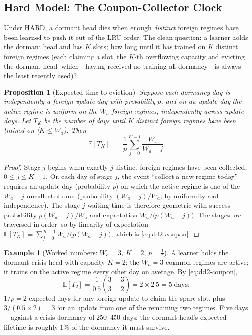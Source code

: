 \documentclass[11pt,a4paper]{article}
\theoremstyle{definition}
\newtheorem{example}{Example}[section]
\theoremstyle{plain}
\newtheorem{proposition}{Proposition}[section]
\newcommand{\E}{\mathbb{E}}
\begin{document}
\subsection{Hard Model: The Coupon-Collector Clock}

Under HARD, a dormant head dies when enough \emph{distinct} foreign regimes
have been learned to push it out of the LRU order. The clean question: a
learner holds the dormant head and has $K$ slots; how long until it has
trained on $K$ distinct foreign regimes (each claiming a slot, the $K$-th
overflowing capacity and evicting the dormant head, which---having received no
training all dormancy---is always the least recently used)?

\begin{proposition}[Expected time to eviction]
\label{prop:dd2-coupon}
Suppose each dormancy day is independently a foreign-update day with
probability $p$, and on an update day the active regime is uniform on the
$W_a$ foreign regimes, independently across update days. Let $T_K$ be the
number of days until $K$ distinct foreign regimes have been trained on
($K \le W_a$). Then
\begin{equation}
\label{eq:dd2-coupon}
\E[T_K] \;=\; \frac{1}{p} \sum_{j=0}^{K-1} \frac{W_a}{W_a - j}.
\end{equation}
\end{proposition}

\begin{proof}
Stage $j$ begins when exactly $j$ distinct foreign regimes have been
collected, $0 \le j \le K-1$. On each day of stage $j$, the event ``collect a
new regime today'' requires an update day (probability $p$) on which the
active regime is one of the $W_a - j$ uncollected ones (probability
$(W_a - j)/W_a$, by uniformity and independence). The stage-$j$ waiting time
is therefore geometric with success probability $p (W_a - j)/W_a$ and
expectation $W_a / \bigl(p (W_a - j)\bigr)$. The stages are traversed in
order, so by linearity of expectation
$\E[T_K] = \sum_{j=0}^{K-1} W_a / \bigl(p(W_a - j)\bigr)$, which is
\eqref{eq:dd2-coupon}.
\end{proof}

\begin{example}[Worked numbers: $W_a = 3$, $K = 2$, $p = \tfrac12$]
\label{ex:dd2-coupon}
A learner holds the dormant \textsf{crisis} head with capacity $K = 2$; the
$W_a = 3$ common regimes are active; it trains on the active regime every
other day on average. By \eqref{eq:dd2-coupon},
\[
\E[T_2]
= \frac{1}{0.5}\left(\frac{3}{3} + \frac{3}{2}\right)
= 2 \times 2.5
= 5 \text{ days}:
\]
$1/p = 2$ expected days for any foreign update to claim the spare slot, plus
$3/(0.5 \times 2) = 3$ for an update from one of the remaining two regimes.
Five days---against a crisis dormancy of $250$--$450$ days: the dormant
head's expected lifetime is roughly $1\%$ of the dormancy it must survive.
\end{example}
\end{document}
